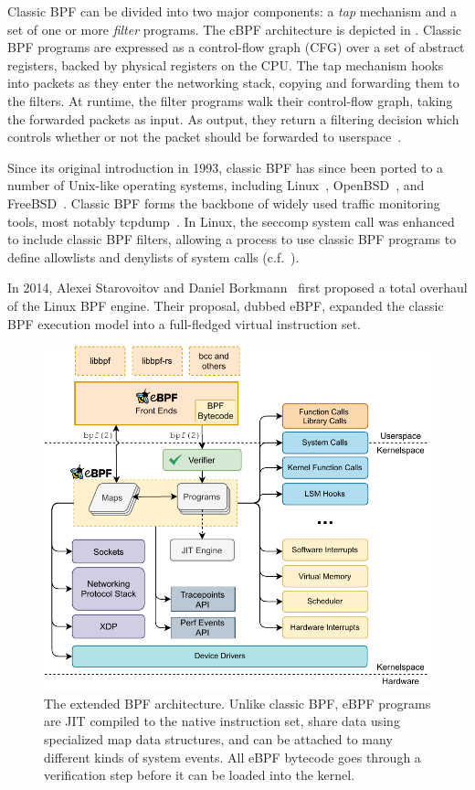 Classic BPF can be divided into two major components: a \textit{tap} mechanism and a set
of one or more \textit{filter} programs. The cBPF architecture is depicted in
. Classic BPF programs are expressed as a control-flow graph (CFG)
over a set of abstract registers, backed by physical registers on the CPU. The tap
mechanism hooks into packets as they enter the networking stack, copying and forwarding
them to the filters. At runtime, the filter programs walk their control-flow graph, taking
the forwarded packets as input. As output, they return a filtering decision which controls
whether or not the packet should be forwarded to userspace~\cite{mccanne1993_bpf}.

Since its original introduction in 1993, classic BPF has since been ported to a number of
Unix-like operating systems, including Linux~\cite{linux_bpf}, OpenBSD~\cite{openbsd_bpf},
and FreeBSD~\cite{freebsd_bpf}. Classic BPF forms the backbone of widely used traffic
monitoring tools, most notably tcpdump~. In Linux, the seccomp system
call was enhanced to include classic BPF filters, allowing a process to use classic BPF
programs to define allowlists and denylists of system calls (c.f.~).

In 2014, Alexei Starovoitov and Daniel Borkmann~\cite{starovoitov2014_ebpf} first proposed
a total overhaul of the Linux BPF engine. Their proposal, dubbed eBPF, expanded the classic BPF
execution model into a full-fledged virtual instruction set. 

\begin{figure}[htb!]
  \centering
  \includegraphics[width=0.8\linewidth]{figs/background/ebpf.pdf}
  \caption[The extended BPF architecture]{The extended BPF architecture. Unlike classic
  BPF, eBPF programs are JIT compiled to the native instruction set, share data using
  specialized map data structures, and can be attached to many different kinds of system
  events. All eBPF bytecode goes through a verification step before it can be loaded into
  the kernel.}%
  \label{fig:extended-bpf}
\end{figure}

